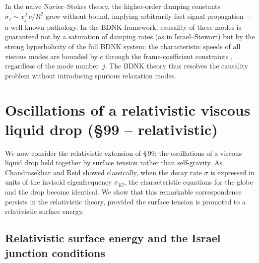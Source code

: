 \begin{causalitycheck}
In the naive Navier--Stokes theory, the higher-order
damping constants $\sigma_{j} \sim x_{j}^{2}\,\nu/R^{2}$ grow
without bound, implying arbitrarily fast signal propagation ---
a well-known pathology.  In the BDNK framework, causality of these
modes is guaranteed not by a saturation of damping rates (as in
Israel--Stewart) but by the strong hyperbolicity of the full BDNK
system: the characteristic speeds of all viscous modes are bounded
by $c$ through the frame-coefficient constraints
\citep{BemficaDN2018,Kovtun2019}, regardless of the mode number~$j$.
The BDNK theory thus resolves the causality problem without
introducing spurious relaxation modes.
\end{causalitycheck}


\section{Oscillations of a relativistic viscous liquid drop
(\S99 -- relativistic)}\label{sec:rel-10-99}

We now consider the relativistic extension of \S\,99: the oscillations
of a viscous liquid drop held together by surface tension rather than
self-gravity.  As Chandrasekhar and Reid showed classically, when the
decay rate $\sigma$ is expressed in units of the inviscid eigenfrequency
$\sigma_{Kl}$, the characteristic equations for the globe and the drop
become identical.  We show that this remarkable correspondence persists
in the relativistic theory, provided the surface tension is promoted to
a relativistic surface energy.

\subsection{Relativistic surface energy and the Israel junction
conditions}\label{sec:rel-10-99-surface}

